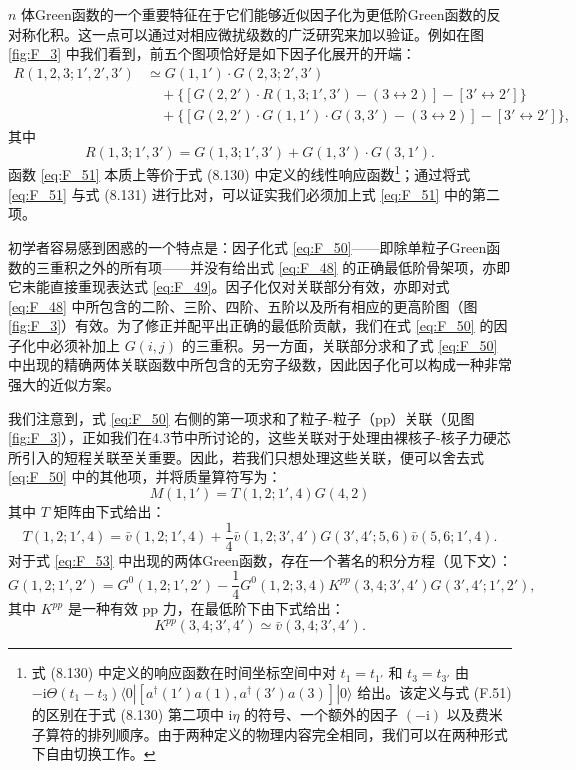 $n$ 体Green函数的一个重要特征在于它们能够近似因子化为更低阶Green函数的反对称化积。这一点可以通过对相应微扰级数的广泛研究来加以验证。例如在图
\ref{fig:F_3} 中我们看到，前五个图项恰好是如下因子化展开的开端：
\begin{align}
R(1,2,3;1',2',3') & \simeq G(1,1')\cdot G(2,3;2',3')\nonumber \\
 & \quad+\Big\{\left[G(2,2')\cdot R(1,3;1',3')-(3\leftrightarrow2)\right]-\left[3'\leftrightarrow2'\right]\Big\}\nonumber \\
 & \quad+\Big\{\left[G(2,2')\cdot G(1,1')\cdot G(3,3')-(3\leftrightarrow2)\right]-\left[3'\leftrightarrow2'\right]\Big\},\label{eq:F_50}
\end{align}
其中
\begin{equation}
R(1,3;1',3')=G(1,3;1',3')+G(1,3')\cdot G(3,1').\label{eq:F_51}
\end{equation}
函数 \ref{eq:F_51} 本质上等价于式 (8.130) 中定义的线性响应函数\footnote{式 (8.130) 中定义的响应函数在时间坐标空间中对 $t_{1}=t_{1'}$ 和 $t_{3}=t_{3'}$ 由 $-\mathrm{i}\Theta(t_{1}-t_{3})\langle0|[a^{\dagger}(1')a(1),a^{\dagger}(3')a(3)]|0\rangle$
给出。该定义与式 (F.51) 的区别在于式 (8.130) 第二项中 $\mathrm{i}\eta$ 的符号、一个额外的因子
$(-\mathrm{i})$ 以及费米子算符的排列顺序。由于两种定义的物理内容完全相同，我们可以在两种形式下自由切换工作。}；通过将式 \ref{eq:F_51} 与式 (8.131) 进行比对，可以证实我们必须加上式 \ref{eq:F_51} 中的第二项。

初学者容易感到困惑的一个特点是：因子化式 \ref{eq:F_50}——即除单粒子Green函数的三重积之外的所有项——并没有给出式
\ref{eq:F_48} 的正确最低阶骨架项，亦即它未能直接重现表达式 \ref{eq:F_49}。因子化仅对关联部分有效，亦即对式
\ref{eq:F_48} 中所包含的二阶、三阶、四阶、五阶以及所有相应的更高阶图（图 \ref{fig:F_3}）有效。为了修正并配平出正确的最低阶贡献，我们在式
\ref{eq:F_50} 的因子化中必须补加上 $G(i,j)$ 的三重积。另一方面，关联部分求和了式 \ref{eq:F_50}
中出现的精确两体关联函数中所包含的无穷子级数，因此因子化可以构成一种非常强大的近似方案。

我们注意到，式 \ref{eq:F_50} 右侧的第一项求和了粒子-粒子（pp）关联（见图 \ref{fig:F_3}），正如我们在4.3节中所讨论的，这些关联对于处理由裸核子-核子力硬芯所引入的短程关联至关重要。因此，若我们只想处理这些关联，便可以舍去式
\ref{eq:F_50} 中的其他项，并将质量算符写为：
\begin{equation}
M(1,1')=T(1,2;1',4)G(4,2)\label{eq:F_52}
\end{equation}
其中 $T$ 矩阵由下式给出：
\begin{equation}
T(1,2;1',4)=\bar{v}(1,2;1',4)+\frac{1}{4}\bar{v}(1,2;3',4')G(3',4';5,6)\bar{v}(5,6;1',4).\label{eq:F_53}
\end{equation}
对于式 \ref{eq:F_53} 中出现的两体Green函数，存在一个著名的积分方程（见下文）\cite{Mi67}：
\begin{equation}
G(1,2;1',2')=G^{0}(1,2;1',2')-\frac{1}{4}G^{0}(1,2;3,4)K^{pp}(3,4;3',4')G(3',4';1',2'),\label{eq:F_54}
\end{equation}
其中 $K^{pp}$ 是一种有效 pp 力，在最低阶下由下式给出：
\begin{equation}
K^{pp}(3,4;3',4')\simeq\bar{v}(3,4;3',4').\label{eq:F_55}
\end{equation}

